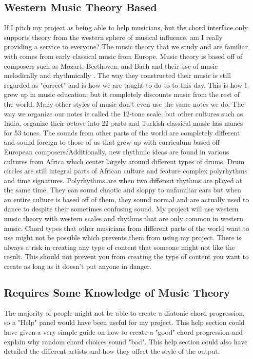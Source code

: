 \documentclass[10pt,twocolumn]{article}
\begin{document}
    \subsection{Western Music Theory Based}
        If I pitch my project as being able to help musicians, but the chord interface only supports theory from the western sphere of musical influence, am I really providing a service to everyone? The music theory that we study and are familiar with comes from early classical music from Europe. Music theory is based off of composers such as Mozart, Beethoven, and Bach and their use of music melodically and rhythmically \cite{Neely}. The way they constructed their music is still regarded as "correct" and is how we are taught to do so to this day. This is how I grew up in music education, but it completely discounts music from the rest of the world. Many other styles of music don't even use the same notes we do. The way we organize our notes is called the 12-tone scale, but other cultures such as India, organize their octave into 22 parts and Turkish classical music has names for 53 tones\cite{Microtones}. The sounds from other parts of the world are completely different and sound foreign to those of us that grew up with curriculum based off European composers.`Additionally, new rhythmic ideas are found in various cultures from Africa which center largely around different types of drums. Drum circles are still integral parts of African culture and feature complex polyrhythms and time signatures.\cite{Poly} Polyrhythms are when two different rhythms are played at the same time. They can sound chaotic and sloppy to unfamiliar ears but when an entire culture is based off of them, they sound normal and are actually used to dance to despite their sometimes confusing sound. My project will use western music theory with western scales and rhythms that are only common in western music. Chord types that other musicians from different parts of the world want to use might not be possible which prevents them from using my project. There is always a risk in creating any type of content that someone might not like the result. This should not prevent you from creating the type of content you want to create as long as it doesn't put anyone in danger.

    \subsection{Requires Some Knowledge of Music Theory}
    The majority of people might not be able to create a diatonic chord progression, so a "Help" panel would have been useful for my project. This help section could have given a very simple guide on how to create a "good" chord progression and explain why random chord choices sound "bad". This help section could also have detailed the different artists and how they affect the style of the output.
\end{document}
